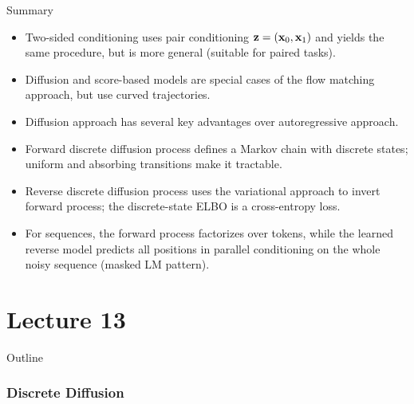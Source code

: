 \documentclass{beamer}
\begin{document}
\begin{frame}{Summary}
	\begin{itemize}
		\item Two-sided conditioning uses pair conditioning $\mathbf{z} = (\mathbf{x}_0, \mathbf{x}_1)$ and yields the same procedure, but is more general (suitable for paired tasks).
		\vfill
		\item Diffusion and score-based models are special cases of the flow matching approach, but use curved trajectories.
		\vfill
		\item Diffusion approach has several key advantages over autoregressive approach.
		\vfill
		\item Forward discrete diffusion process defines a Markov chain with discrete states; uniform and absorbing transitions make it tractable.
		\vfill
		\item Reverse discrete diffusion process uses the variational approach to invert forward process; the discrete-state ELBO is a cross-entropy loss.
		\vfill
		\item For sequences, the forward process factorizes over tokens, while the learned reverse model predicts all positions in parallel conditioning on the whole noisy sequence (masked LM pattern).
	\end{itemize}
\end{frame}

\part{Lecture 13}

\begin{frame}
\titlepage
	\resetonslide
\end{frame}







\begin{frame}{Outline}
	\tableofcontents[part=13]
\end{frame}
\section{Discrete Diffusion}
\end{document}
